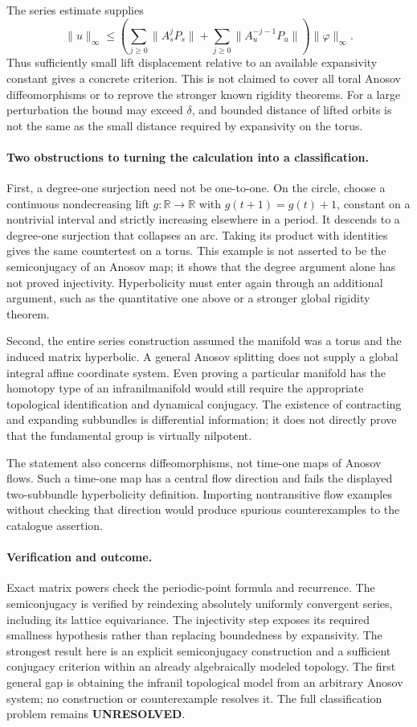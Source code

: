 \documentclass[11pt]{article}
\begin{document}
The series estimate supplies
\[
 \|u\|_\infty\le
 \left(\sum_{j\ge0}\|A_s^jP_s\|+
       \sum_{j\ge0}\|A_u^{-j-1}P_u\|\right)\|\varphi\|_\infty.
\]
Thus sufficiently small lift displacement relative to an available
expansivity constant gives a concrete criterion. This is not claimed
to cover all toral Anosov diffeomorphisms or to reprove the stronger
known rigidity theorems. For a large perturbation the bound may exceed
$\delta$, and bounded distance of lifted orbits is not the same as
the small distance required by expansivity on the torus.

\paragraph{Two obstructions to turning the calculation into a classification.}
First, a degree-one surjection need not be one-to-one. On the circle,
choose a continuous nondecreasing lift $g:\mathbb R\to\mathbb R$
with $g(t+1)=g(t)+1$, constant on a nontrivial interval and strictly
increasing elsewhere in a period. It descends to a degree-one
surjection that collapses an arc. Taking its product with identities
gives the same countertest on a torus. This example is not asserted
to be the semiconjugacy of an Anosov map; it shows that the degree
argument alone has not proved injectivity. Hyperbolicity must enter
again through an additional argument, such as the quantitative one
above or a stronger global rigidity theorem.

Second, the entire series construction assumed the manifold was a
torus and the induced matrix hyperbolic. A general Anosov splitting
does not supply a global integral affine coordinate system. Even
proving a particular manifold has the homotopy type of an infranilmanifold
would still require the appropriate topological identification and
dynamical conjugacy. The existence of contracting and expanding
subbundles is differential information; it does not directly prove that
the fundamental group is virtually nilpotent.

The statement also concerns diffeomorphisms, not time-one maps of
Anosov flows. Such a time-one map has a central flow direction and
fails the displayed two-subbundle hyperbolicity definition. Importing
nontransitive flow examples without checking that direction would
produce spurious counterexamples to the catalogue assertion.

\paragraph{Verification and outcome.}
Exact matrix powers check the periodic-point formula and recurrence.
The semiconjugacy is verified by reindexing absolutely uniformly
convergent series, including its lattice equivariance. The injectivity
step exposes its required smallness hypothesis rather than replacing
boundedness by expansivity. The strongest result here is an explicit
semiconjugacy construction and a sufficient conjugacy criterion within
an already algebraically modeled topology. The first general gap is
obtaining the infranil topological model from an arbitrary Anosov
system; no construction or counterexample resolves it. The full
classification problem remains \textbf{UNRESOLVED}.
\end{document}
